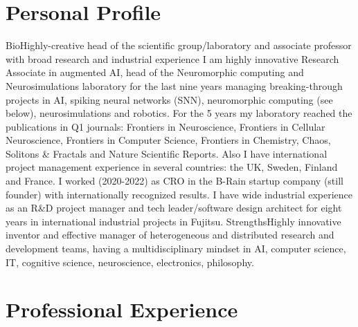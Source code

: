 \documentclass{moderncv}
\begin{document}
%
    \makecvtitle


    \section{Personal Profile}

    \cventry
        {Bio}{Highly-creative head of the scientific group/laboratory and associate professor with broad research and industrial experience}{}{}{}
        {I am highly innovative Research Associate in augmented AI, head of the Neuromorphic computing and Neurosimulations laboratory for the last nine years managing breaking-through projects in AI, spiking neural networks (SNN),  neuromorphic computing (see below), neurosimulations and robotics.
      For the 5 years my laboratory reached the publications in Q1 journals: Frontiers in Neuroscience, Frontiers in Cellular Neuroscience, Frontiers in Computer Science, Frontiers in Chemistry, Chaos, Solitons \& Fractals and Nature Scientific Reports. 
      Also I have international project management experience in several countries: the UK, Sweden, Finland and France. I worked (2020-2022) as CRO in the B-Rain startup company (still founder) with internationally recognized results.
    I have wide industrial experience as an R\&D project manager and tech leader/software design architect for eight years in international industrial projects in Fujitsu.}
    \cvitem
    {Strengths}{\small Highly innovative inventor and effective manager of heterogeneous and distributed research and development teams, having a multidisciplinary mindset in AI, computer science, IT, cognitive science, neuroscience, electronics, philosophy.}
    
    \section{Professional Experience}
\end{document}
